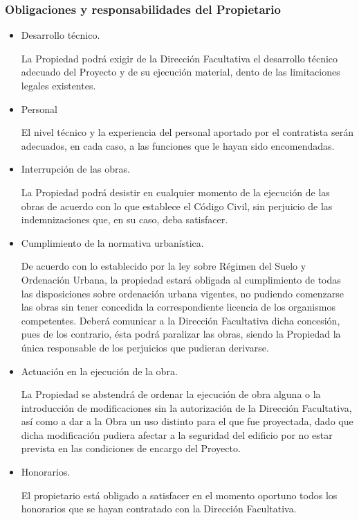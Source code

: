 \documentclass[../main.tex]{subfiles}
\begin{document}
\subsubsection{Obligaciones y responsabilidades del Propietario}
\begin{itemize}
    \item Desarrollo técnico. \par
    \vspace{0.5 cm}
    La Propiedad podrá exigir de la Dirección Facultativa el desarrollo técnico adecuado del Proyecto y de su ejecución material, dento de las limitaciones legales existentes.
    \item Personal \par
    \vspace{0.5 cm}
    El nivel técnico y la experiencia del personal aportado por el contratista serán adecuados, en cada caso, a las funciones que le hayan sido encomendadas.
    \item Interrupción de las obras. \par
    \vspace{0.5 cm}
    La Propiedad podrá desistir en cualquier momento de la ejecución de las obras de acuerdo con lo que establece el Código Civil, sin perjuicio de las indemnizaciones que, en su caso, deba satisfacer.
    \item Cumplimiento de la normativa urbanística. \par
    \vspace{0.5 cm}
    De acuerdo con lo establecido por la ley sobre Régimen del Suelo y Ordenación Urbana, la propiedad estará obligada al cumplimiento de todas las disposiciones sobre ordenación urbana vigentes, no pudiendo comenzarse las obras sin tener concedida la correspondiente licencia de los organismos competentes. Deberá comunicar a la Dirección Facultativa dicha concesión, pues de los contrario, ésta podrá paralizar las obras, siendo la Propiedad la única responsable de los perjuicios que pudieran derivarse.
    \item Actuación en la ejecución de la obra. \par
    \vspace{0.5 cm}
    La Propiedad se abstendrá de ordenar la ejecución de obra alguna o la introducción de modificaciones sin la autorización de la Dirección Facultativa, así como a dar a la Obra un uso distinto para el que fue proyectada, dado que dicha modificación pudiera afectar a la seguridad del edificio por no estar prevista en las condiciones de encargo del Proyecto.
    \item Honorarios. \par
    \vspace{0.5 cm}
    El propietario está obligado a satisfacer en el momento oportuno todos los honorarios que se hayan contratado con la Dirección Facultativa.
\end{itemize}
\end{document}
